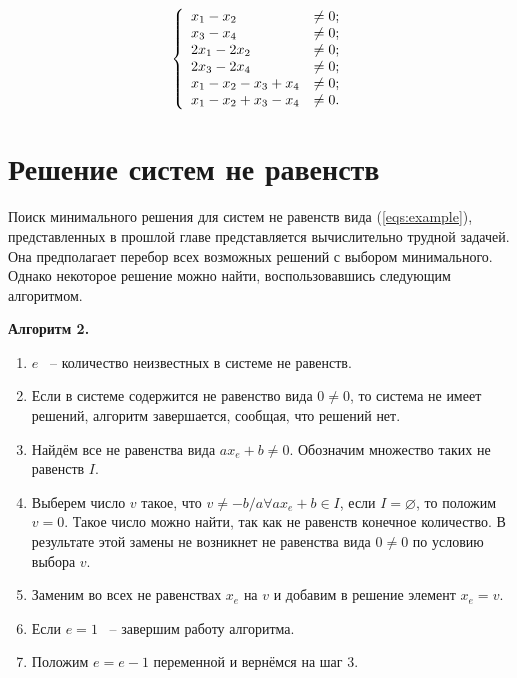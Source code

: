 \documentclass[14pt]{mmcs-article}
\begin{document}
\begin{equation}
    \centering
    \left\{
        \begin{array}{ll}
            x_1 - x_2 &\neq 0             ; \\
            x_3 - x_4 &\neq 0             ; \\
            2 x_1 - 2 x_2 &\neq 0         ; \\
            2 x_3 - 2 x_4 &\neq 0         ; \\
            x_1 - x_2 - x_3 + x_4 &\neq 0 ; \\
            x_1 - x_2 + x_3 - x_4 &\neq 0 . \\
        \end{array}
        \label{eqs:cycle_search_neqs}
    \right.
\end{equation}

\section{Решение систем не равенств}

Поиск минимального решения для систем не равенств вида (\ref{eqs:example}), представленных в прошлой главе представляется вычислительно трудной задачей. Она предполагает перебор всех возможных решений с выбором минимального. Однако некоторое решение можно найти, воспользовавшись следующим алгоритмом.

\textbf{Алгоритм 2.}

\begin{enumerate}
    \item $e$ ~-- количество неизвестных в системе не равенств.
    \item Если в системе содержится не равенство вида $0 \neq 0$, то система не имеет решений, алгоритм завершается, сообщая, что решений нет.
    \item Найдём все не равенства вида $a x_e + b \neq 0$. Обозначим множество таких не равенств $I$.
    \item Выберем число $v$ такое, что $v \neq -b/a \forall a x_e + b \in I$, если $I = \varnothing$, то положим $v = 0$. Такое число можно найти, так как не равенств конечное количество. В результате этой замены не возникнет не равенства вида $0 \neq 0$ по условию выбора $v$.
    \item Заменим во всех не равенствах $x_e$ на $v$ и добавим в решение элемент $x_e = v$.
    \item Если $e = 1$ ~-- завершим работу алгоритма.
    \item Положим $e = e - 1$ переменной и вернёмся на шаг 3.
\end{enumerate}
\end{document}
